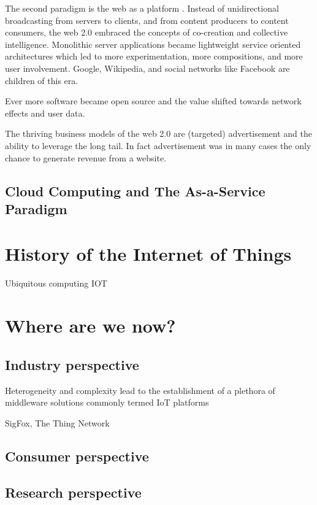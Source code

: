 The second paradigm is the web as a platform \cite{o2007web}. Instead of unidirectional broadcasting from servers to clients, and from content producers to content consumers, the web 2.0 embraced the concepts of co-creation and collective intelligence. Monolithic server applications became lightweight service oriented architectures which led to more experimentation, more compositions, and more user involvement. Google, Wikipedia, and social networks like Facebook are children of this era.

Ever more software became open source and the value shifted towards network effects and user data.

The thriving business models of the web 2.0 are (targeted) advertisement and the ability to leverage the long tail. In fact advertisement was in many cases the only chance to generate revenue from a website.  



\subsection{Cloud Computing and The As-a-Service Paradigm}

\section{History of the Internet of Things}
Ubiquitous computing
IOT 

\section{Where are we now?}


\subsection{Industry perspective}

Heterogeneity and complexity lead to the establishment of a plethora of middleware solutions commonly termed IoT platforms

SigFox, The Thing Network

\subsection{Consumer perspective}

\subsection{Research perspective}

